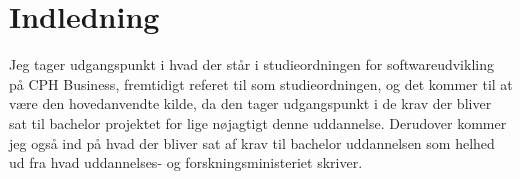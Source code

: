 \documentclass[class=report, crop=false]{standalone}
\begin{document}
    \section{Indledning}
    Jeg tager udgangspunkt i hvad der står i studieordningen for softwareudvikling på CPH Business,
    fremtidigt referet til som studieordningen, og det kommer til at være den hovedanvendte kilde,
    da den tager udgangspunkt i de krav der bliver sat til bachelor projektet for lige nøjagtigt 
    denne uddannelse. Derudover kommer jeg også ind på hvad der bliver sat af krav til bachelor uddannelsen
    som helhed ud fra hvad uddannelses- og forskningsministeriet skriver.
\end{document}
